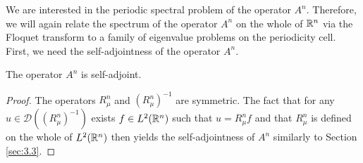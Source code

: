 We are interested in the periodic spectral problem of the operator $A^{n}$. Therefore, we will again relate the spectrum of the operator $A^{n}$ on the whole of $\mathbb{R}^{n}$ via the Floquet transform to a family of eigenvalue problems on the periodicity cell. First, we need the self-adjointness of the operator $A^{n}$.

\begin{remark}
	The operator $A^{n}$ is self-adjoint.	
\end{remark}

\begin{proof}
	The operators $R_{\mu}^{n}$ and $\left(R_{\mu}^{n}\right)^{-1}$ are symmetric. The fact that for any $u \in \mathcal{D}\left(\left(R_{\mu}^{n}\right)^{-1}\right)$ exists $f \in L^{2}(\mathbb{R}^{n})$ such that $u = R_{\mu}^{n} f$ and that $R_{\mu}^{n}$ is defined on the whole of $L^{2}(\mathbb{R}^{n})$ then yields the self-adjointness of $A^{n}$ similarly to Section \ref{sec:3.3}.
\end{proof}

